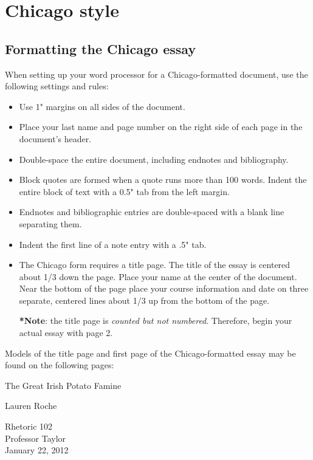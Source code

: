 
\chapter{Chicago style}

\section{Formatting the Chicago essay}

When setting up your word processor for a Chicago-formatted document, use the 
following settings and rules:

\begin{itemize}

\item Use 1" margins on all sides of the document.
\item Place your last name and page number on the right side of each page in the 
document's header.
\item Double-space the entire document, including endnotes and bibliography.
\item Block quotes are formed when a quote runs more than 100 words. Indent the entire 
block of text with a 0.5" tab from the left margin.
\item Endnotes and bibliographic entries are double-spaced with a blank line separating 
them.
\item Indent the first line of a note entry with a .5" tab.
\item The Chicago form requires a title page. The title of the essay is centered about 
1/3 down the page. Place your name at the center of the document. Near the bottom 
of the page place your course information and date on three separate, centered lines 
about 1/3 up from the bottom of the page.

\textbf{*}\textbf{Note}: the title page is \emph{counted but not numbered}. Therefore, 
begin your actual essay with page 2.
\end{itemize}

Models of the title page and first page of the Chicago-formatted essay may be found on 
the following pages:

\newpage
\thispagestyle{empty}
\begin{Spacing}{2}
\vspace* {3cm}
\begin{center}The Great Irish Potato Famine\end{center}
\vspace {4cm}
\begin{center}Lauren Roche\end{center}
\vspace {5cm}
\begin{center}Rhetoric 102\\
Professor Taylor\\
January 22, 2012\end{center}
\end{Spacing}
\newpage

